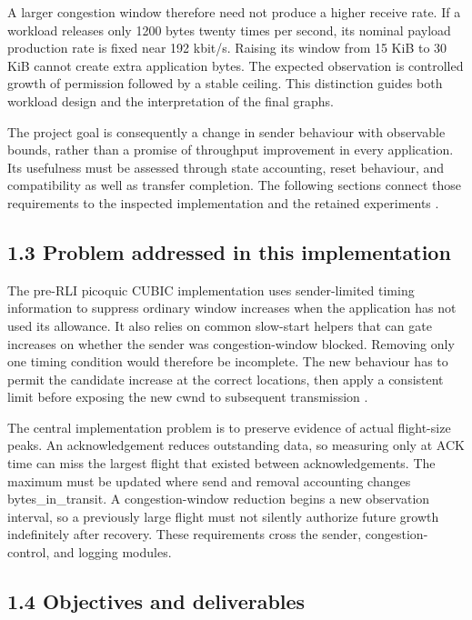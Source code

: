 A larger congestion window therefore need not produce a higher receive rate. If a workload releases only 1200 bytes twenty times per second, its nominal payload production rate is fixed near 192 kbit/s. Raising its window from 15 KiB to 30 KiB cannot create extra application bytes. The expected observation is controlled growth of permission followed by a stable ceiling. This distinction guides both workload design and the interpretation of the final graphs.


The project goal is consequently a change in sender behaviour with observable bounds, rather than a promise of throughput improvement in every application. Its usefulness must be assessed through state accounting, reset behaviour, and compatibility as well as transfer completion. The following sections connect those requirements to the inspected implementation and the retained experiments \cite{ref12,ref13}.


\subsection*{1.3 Problem addressed in this implementation}

The pre-RLI picoquic CUBIC implementation uses sender-limited timing information to suppress ordinary window increases when the application has not used its allowance. It also relies on common slow-start helpers that can gate increases on whether the sender was congestion-window blocked. Removing only one timing condition would therefore be incomplete. The new behaviour has to permit the candidate increase at the correct locations, then apply a consistent limit before exposing the new cwnd to subsequent transmission \cite{ref12}.


The central implementation problem is to preserve evidence of actual flight-size peaks. An acknowledgement reduces outstanding data, so measuring only at ACK time can miss the largest flight that existed between acknowledgements. The maximum must be updated where send and removal accounting changes bytes\_in\_transit. A congestion-window reduction begins a new observation interval, so a previously large flight must not silently authorize future growth indefinitely after recovery. These requirements cross the sender, congestion-control, and logging modules.


\subsection*{1.4 Objectives and deliverables}

